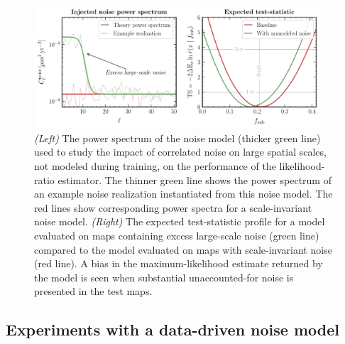 \documentclass[twocolumn]{aastex631}
\begin{document}
\begin{figure}[!htbp]
\centering
\includegraphics[width=0.95\textwidth]{lowell_noise}
\caption{\emph{(Left)} The power spectrum of the noise model (thicker green line) used to study the impact of correlated noise on large spatial scales, not modeled during training, on the performance of the likelihood-ratio estimator. The thinner green line shows the power spectrum of an example noise realization instantiated from this noise model. The red lines show corresponding power spectra for a scale-invariant noise model.  \emph{(Right)} The expected  test-statistic profile for a model evaluated on maps containing excess large-scale noise (green line) compared to the model evaluated on maps with scale-invariant noise (red line). A bias in the maximum-likelihood estimate returned by the model is seen when substantial unaccounted-for noise is presented in the test maps.}
\label{fig:noise_test}
\end{figure}

\subsection{Experiments with a data-driven noise model}
\label{sec:dr2_noise}
\end{document}
